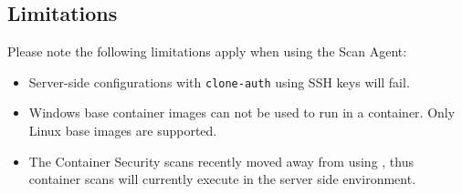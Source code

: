 \subsection{Limitations}
Please note the following limitations apply when using the Scan Agent:

\begin{itemize}
  \item Server-side configurations with \texttt{clone-auth} using SSH keys will fail.
  \item Windows base container images can not be used to run \scaresolver in a container.  Only Linux base images are supported.
  \item The Container Security scans recently moved away from using \scaresolverns, thus container scans will currently
    execute in the \cxoneflow server side environment.
\end{itemize}

